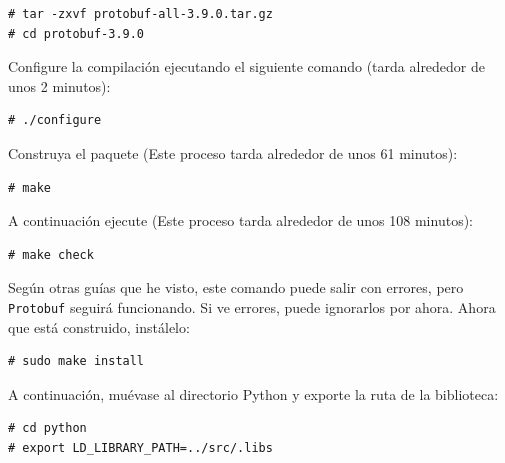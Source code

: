 \begin{verbatim}
# tar -zxvf protobuf-all-3.9.0.tar.gz
# cd protobuf-3.9.0
\end{verbatim}

\vspace{-0.5cm}

Configure la compilación ejecutando el siguiente comando (tarda alrededor de unos 2 minutos):

\vspace{-0.7cm}

\begin{verbatim}
# ./configure
\end{verbatim}

\vspace{-0.5cm}

Construya el paquete (Este proceso tarda alrededor de unos 61 minutos):

\vspace{-0.8cm}

\begin{verbatim}
# make
\end{verbatim}

\vspace{-0.5cm}

A continuación ejecute (Este proceso tarda alrededor de unos 108 minutos):

\vspace{-0.8cm}

\begin{verbatim}
# make check 
\end{verbatim}

\vspace{-0.5cm}

Según otras guías que he visto, este comando puede salir con errores, pero \texttt{Protobuf} seguirá funcionando. Si ve errores, puede ignorarlos por ahora. Ahora que está construido, instálelo:

\vspace{-0.8cm}

\begin{verbatim}
# sudo make install
\end{verbatim}

\vspace{-0.5cm}

A continuación, muévase al directorio Python y exporte la ruta de la biblioteca:

\vspace{-0.8cm}

\begin{verbatim}
# cd python
# export LD_LIBRARY_PATH=../src/.libs
\end{verbatim}

